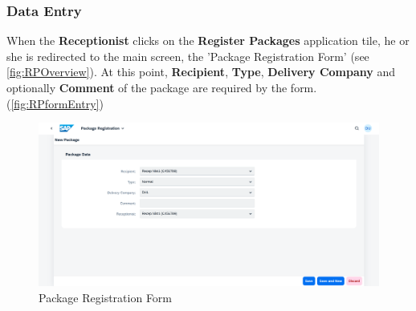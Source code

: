 \subsubsection{Data Entry}

When the \textbf{Receptionist} clicks on the \textbf{Register Packages} application tile, he or she is redirected to the main screen, the 'Package Registration Form' (see \autoref{fig:RPOverview}). At this point, \textbf{Recipient}, \textbf{Type}, \textbf{Delivery Company} and optionally \textbf{Comment} of the package are required by the form. (\autoref{fig:RPformEntry})

\begin{figure}[htb!]
	\centering
	\includegraphics[width=0.95\linewidth]{images/user_doc/registration/overview.png}
	\caption{Package Registration Form}
	\label{fig:RPOverview}
\end{figure}


